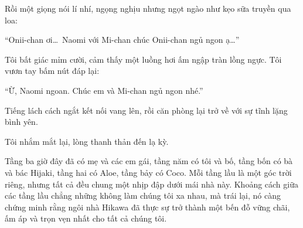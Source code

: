 \documentclass[../main.tex]{subfiles}
\begin{document}
Rồi một giọng nói lí nhí, ngọng nghịu nhưng ngọt ngào như kẹo sữa truyền qua loa:

``Onii-chan ơi\dots\ Naomi với Mi-chan chúc Onii-chan ngủ ngon ạ\dots''

Tôi bất giác mỉm cười, cảm thấy một luồng hơi ấm ngập tràn lồng ngực. Tôi vươn tay bấm nút đáp lại:

``Ừ, Naomi ngoan. Chúc em và Mi-chan ngủ ngon nhé.''

Tiếng lách cách ngắt kết nối vang lên, rồi căn phòng lại trở về với sự tĩnh lặng bình yên.

Tôi nhắm mắt lại, lòng thanh thản đến lạ kỳ.

Tầng ba giờ đây đã có mẹ và các em gái, tầng năm có tôi và bố, tầng bốn có bà và bác Hijaki, tầng hai có Aloe, tầng bảy có Coco. Mỗi tầng lầu là một góc trời riêng, nhưng tất cả đều chung một nhịp đập dưới mái nhà này. Khoảng cách giữa các tầng lầu chẳng những không làm chúng tôi xa nhau, mà trái lại, nó càng chứng minh rằng ngôi nhà Hikawa đã thực sự trở thành một bến đỗ vững chãi, ấm áp và trọn vẹn nhất cho tất cả chúng tôi.
\end{document}

